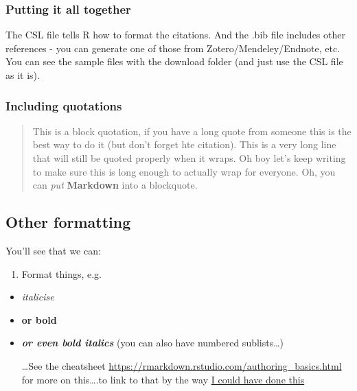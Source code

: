 \documentclass[]{article}
\providecommand{\tightlist}{%
  \setlength{\itemsep}{0pt}\setlength{\parskip}{0pt}}
\begin{document}
\hypertarget{putting-it-all-together}{%
\subsubsection{Putting it all together}\label{putting-it-all-together}}

The CSL file tells R how to format the citations. And the .bib file
includes other references - you can generate one of those from
Zotero/Mendeley/Endnote, etc. You can see the sample files with the
download folder (and just use the CSL file as it is).

\hypertarget{including-quotations}{%
\subsubsection{Including quotations}\label{including-quotations}}

\begin{quote}
This is a block quotation, if you have a long quote from someone this is
the best way to do it (but don't forget hte citation). This is a very
long line that will still be quoted properly when it wraps. Oh boy let's
keep writing to make sure this is long enough to actually wrap for
everyone. Oh, you can \emph{put} \textbf{Markdown} into a blockquote.
\end{quote}

\hypertarget{other-formatting}{%
\subsection{Other formatting}\label{other-formatting}}

You'll see that we can:

\begin{enumerate}
\def\labelenumi{\arabic{enumi}.}
\tightlist
\item
  Format things, e.g.
\end{enumerate}

\begin{itemize}
\item
  \emph{italicise}
\item
  \textbf{or bold}
\item
  \textbf{\emph{or even bold italics}} (you can also have numbered
  sublists\ldots)

  \ldots See the cheatsheet
  \url{https://rmarkdown.rstudio.com/authoring_basics.html} for more on
  this\ldots.to link to that by the way
  \href{https://rmarkdown.rstudio.com/authoring_basics.html}{I could
  have done this}
\end{itemize}
\end{document}
